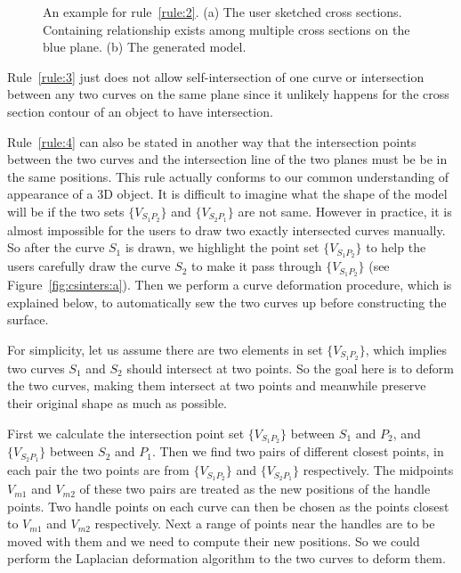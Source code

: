 \begin{figure} [htbp]
{\begin{minipage}[b]{0.22\textwidth}
    \end{minipage}}
  \caption{An example for rule~\ref{rule:2}. 
  (a) The user sketched cross sections. Containing relationship exists among multiple cross sections on the blue plane. 
  (b) The generated model.}
  \label{fig:rule2} %
\end{figure}

Rule~\ref{rule:3} just does not allow self-intersection of one
curve or intersection between any two curves on the same plane since
it unlikely happens for the cross section contour of an object to
have intersection.

Rule~\ref{rule:4} can also be stated in another way that the
intersection points between the two curves and the intersection line
of the two planes must be be in the same positions. This rule
actually conforms to our common understanding of appearance of a 3D
object. It is difficult to imagine what the shape of the model will
be if the two sets $\{V_{S_1P_2}\}$ and $\{V_{S_2P_1}\}$ are not
same. However in practice, it is almost impossible for the users to
draw two exactly intersected curves manually. So after the curve
$S_1$ is drawn, we highlight the point set $\{V_{S_1P_2}\}$ to help
the users carefully draw the curve $S_2$ to make it pass through
$\{V_{S_1P_2}\}$ (see Figure~\ref{fig:csinters:a}). Then we perform
a curve deformation procedure, which is explained below, to
automatically sew the two curves up before constructing the surface.

For simplicity, let us assume there are two elements  in set
$\{V_{S_1P_2}\}$, which implies two curves $S_1$ and $S_2$ should
intersect at two points. So the goal here is to deform the two
curves, making them intersect at two points and meanwhile preserve
their original shape as much as possible.

First we calculate the intersection point set  $\{V_{S_1P_2}\}$
between $S_1$ and $P_2$, and $\{V_{S_2P_1}\}$ between $S_2$ and
$P_1$. Then we find two pairs of different closest points, in each
pair the two points are from $\{V_{S_1P_2}\}$ and $\{V_{S_2P_1}\}$
respectively. The midpoints $V_{m1}$ and $V_{m2}$ of these two pairs
are treated as the new positions of the handle points. Two handle
points on each curve can then be chosen as the points closest to
$V_{m1}$ and $V_{m2}$ respectively. Next a range of points near the
handles are to be moved with them and we need to compute their new
positions. So we could perform the Laplacian deformation algorithm
to the two curves to deform them.

